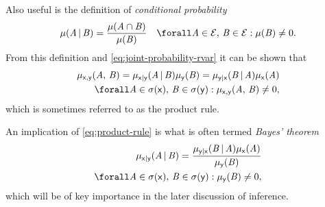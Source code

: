Also useful is the definition of \emph{conditional probability}
\begin{equation}\label{eq:conditional-probability}
  \mu(\set{A} \gvn \set{B}) =
  \frac{\mu(\set{A} \cap \set{B})}{\mu(\set{B})}
  \quad \forall \set{A} \in \sset{E},\,\set{B} \in \sset{E} : \mu(\set{B}) \neq 0.
\end{equation}
From this definition and \eqref{eq:joint-probability-rvar} it can be shown that
\begin{equation}\label{eq:product-rule}
\begin{split}
  \mu_{\rvar{x},\rvar{y}}(\set{A},\,\set{B}) =
  \mu_{\rvar{x}|\rvar{y}}(\set{A} \gvn \set{B}) \mu_{\rvar{y}}(\set{B}) =
  \mu_{\rvar{y}|\rvar{x}}(\set{B} \gvn \set{A}) \mu_{\rvar{x}}(\set{A})\\
  \forall \set{A} \in \sigma(\rvar{x}),\,\set{B} \in \sigma(\rvar{y}) : 
  \mu_{\rvar{x},\rvar{y}}(\set{A},\,\set{B}) \neq 0,
\end{split}
\end{equation}
which is sometimes referred to as the product rule. 

An implication of \eqref{eq:product-rule} is what is often termed \emph{Bayes' theorem}
\begin{equation}\label{eq:bayes-theorem}
\begin{split}
  \mu_{\rvar{x}|\rvar{y}}(\set{A} \gvn \set{B}) =
  \frac{\mu_{\rvar{y}|\rvar{x}}(\set{B} \gvn \set{A}) \mu_{\rvar{x}}(\set{A})}{\mu_{\rvar{y}}(\set{B})} 
  \\
  \forall \set{A} \in \sigma(\rvar{x}),\,
  \set{B} \in \sigma(\rvar{y}) : \mu_{\rvar{y}}(\set{B}) \neq 0,
\end{split}
\end{equation}
which will be of key importance in the later discussion of inference.



